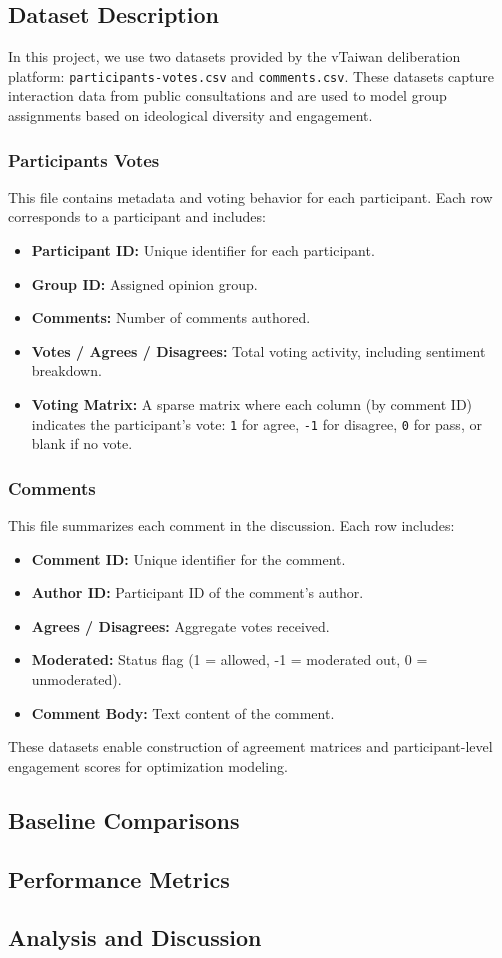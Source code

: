 \subsection*{Dataset Description}

In this project, we use two datasets provided by the vTaiwan deliberation platform: \texttt{participants-votes.csv} and \texttt{comments.csv}. These datasets capture interaction data from public consultations and are used to model group assignments based on ideological diversity and engagement.

\subsubsection*{Participants Votes}

This file contains metadata and voting behavior for each participant. Each row corresponds to a participant and includes:
\begin{itemize}
    \item \textbf{Participant ID:} Unique identifier for each participant.
    \item \textbf{Group ID:} Assigned opinion group.
    \item \textbf{Comments:} Number of comments authored.
    \item \textbf{Votes / Agrees / Disagrees:} Total voting activity, including sentiment breakdown.
    \item \textbf{Voting Matrix:} A sparse matrix where each column (by comment ID) indicates the participant's vote: \texttt{1} for agree, \texttt{-1} for disagree, \texttt{0} for pass, or blank if no vote.
\end{itemize}

\subsubsection*{Comments}

This file summarizes each comment in the discussion. Each row includes:
\begin{itemize}
    \item \textbf{Comment ID:} Unique identifier for the comment.
    \item \textbf{Author ID:} Participant ID of the comment's author.
    \item \textbf{Agrees / Disagrees:} Aggregate votes received.
    \item \textbf{Moderated:} Status flag (1 = allowed, -1 = moderated out, 0 = unmoderated).
    \item \textbf{Comment Body:} Text content of the comment.
\end{itemize}

These datasets enable construction of agreement matrices and participant-level engagement scores for optimization modeling.

\subsection*{Baseline Comparisons}
\subsection*{Performance Metrics}
\subsection*{Analysis and Discussion}